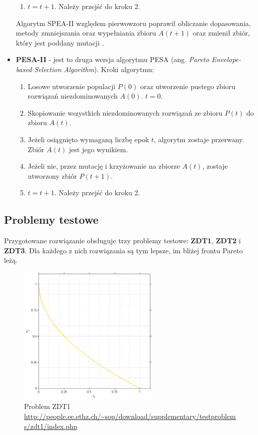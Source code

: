 \documentclass{classrep}
\begin{document}
\begin{itemize}
\begin{enumerate}
        \item $t = t + 1$. Należy przejść do kroku 2.
    \end{enumerate}
    Algorytm SPEA-II względem pierwowzoru poprawił obliczanie dopasowania, metody zmniejszania oraz wypełniania zbioru $A(t+1)$ oraz zmienił zbiór, który jest poddany mutacji \cite{CleverAlgs}\cite{SPEA2_1}\cite{SPEA2_2}.
    \item \textbf{PESA-II} - jest to druga wersja algorytmu PESA (ang. \textit{Pareto Envelope-based Selection Algorithm}). Kroki algorytmu:
    \begin{enumerate}
        \item Losowe utworzenie populacji $P(0)$ oraz utworzenie pustego zbioru rozwiązań niezdominowanych $A(0)$. $t = 0$. 
        \item Skopiowanie wszystkich niezdominowanych rozwiązań ze zbioru $P(t)$ do zbioru $A(t)$.
        \item Jeżeli osiągnięto wymaganą liczbę epok $t$, algorytm zostaje przerwany. Zbiór $A(t)$ jest jego wynikiem.
        \item Jeżeli nie, przez mutację i krzyżowanie na zbiorze $A(t)$, zostaje utworzony zbiór $P(t+1)$.
        \item $t = t + 1$. Należy przejść do kroku 2.
    \end{enumerate}
    \cite{PESA}
\end{itemize}


\subsection{Problemy testowe}

Przygotowane rozwiązanie obsługuje trzy problemy testowe: \textbf{ZDT1}, \textbf{ZDT2} i \textbf{ZDT3}. Dla każdego z nich rozwiązania są tym lepsze, im bliżej frontu Pareto leżą.

\begin{figure}[H]
    \centering
    \includegraphics[width=0.6\textwidth]{img2/zdt1.png}
    \caption{Problem ZDT1 \url{http://people.ee.ethz.ch/~sop/download/supplementary/testproblems/zdt1/index.php}}
\end{figure}
\end{document}
